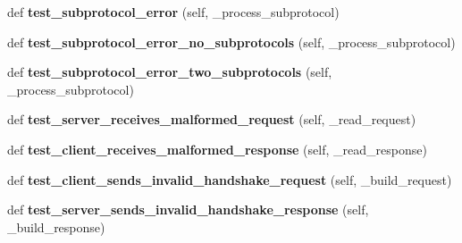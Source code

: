 \begin{DoxyCompactItemize}
def {\bfseries test\+\_\+subprotocol\+\_\+error} (self, \+\_\+process\+\_\+subprotocol)
\item 
\mbox{\label{classwebsockets_1_1test__client__server_1_1_client_server_tests_ad02bcfeb9d93d0f3f8745daeaa7f6351}} 
def {\bfseries test\+\_\+subprotocol\+\_\+error\+\_\+no\+\_\+subprotocols} (self, \+\_\+process\+\_\+subprotocol)
\item 
\mbox{\label{classwebsockets_1_1test__client__server_1_1_client_server_tests_af8022be2683e13e4e2b271b56d6bc353}} 
def {\bfseries test\+\_\+subprotocol\+\_\+error\+\_\+two\+\_\+subprotocols} (self, \+\_\+process\+\_\+subprotocol)
\item 
\mbox{\label{classwebsockets_1_1test__client__server_1_1_client_server_tests_a98d74c75ec77a3cca0da0dc0dee2fa71}} 
def {\bfseries test\+\_\+server\+\_\+receives\+\_\+malformed\+\_\+request} (self, \+\_\+read\+\_\+request)
\item 
\mbox{\label{classwebsockets_1_1test__client__server_1_1_client_server_tests_ad04c081a4715662f9262782a2ff02ed5}} 
def {\bfseries test\+\_\+client\+\_\+receives\+\_\+malformed\+\_\+response} (self, \+\_\+read\+\_\+response)
\item 
\mbox{\label{classwebsockets_1_1test__client__server_1_1_client_server_tests_ac0b010868ba567694baa5c7f57bed9ff}} 
def {\bfseries test\+\_\+client\+\_\+sends\+\_\+invalid\+\_\+handshake\+\_\+request} (self, \+\_\+build\+\_\+request)
\item 
\mbox{\label{classwebsockets_1_1test__client__server_1_1_client_server_tests_afe58a1cf5f363fdb8c13ecd2dd5c21bd}} 
def {\bfseries test\+\_\+server\+\_\+sends\+\_\+invalid\+\_\+handshake\+\_\+response} (self, \+\_\+build\+\_\+response)
\item 
\mbox{\label{classwebsockets_1_1test__client__server_1_1_client_server_tests_a14aa32ca23747027b5fd68e1d4fbe908}} 

\end{DoxyCompactItemize}
